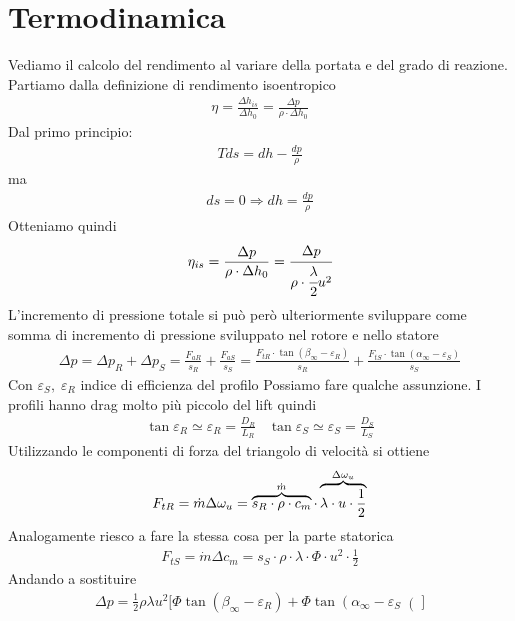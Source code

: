 \section{Termodinamica}
Vediamo il calcolo del rendimento al variare della portata e del grado di reazione. Partiamo dalla definizione di rendimento isoentropico
\begin{align*}
\eta = \frac{\Delta h_{is}}{\Delta h_0} = \frac{\Delta p}{\rho \cdot \Delta h_0}
\end{align*}
Dal primo principio:
\begin{align*}
T ds = dh - \frac{dp}{\rho}
\end{align*}
ma
\begin{align*}
ds = 0 \Rightarrow dh = \frac{dp}{\rho}
\end{align*}
Otteniamo quindi
\begin{equation}\label{eq:etadp}
\eta_{is} = \frac{\Delta p}{\rho \cdot \Delta h_0} = \cfrac{\Delta p}{\rho \cdot \cfrac{\lambda}{2} u^2}
\end{equation}
L'incremento di pressione totale si può però ulteriormente sviluppare come somma di incremento di pressione sviluppato nel rotore e nello statore
\begin{align*}
\Delta p = \Delta p_R + \Delta p_S = \frac{F_{aR}}{s_R} + \frac{F_{aS}}{s_S} = \frac{F_{tR} \cdot \tan(\beta_{\infty} - \varepsilon_R)}{s_R} + \frac{F_{tS} \cdot \tan(\alpha_{\infty} - \varepsilon_S)}{s_S}
\end{align*}
Con $\varepsilon_S, \; \varepsilon_R$ indice di efficienza del profilo
Possiamo fare qualche assunzione. I profili hanno drag molto più piccolo del lift quindi
\begin{align*}
\tan \varepsilon_R \simeq \varepsilon_R = \frac{D_R}{L_R} \;\;\; \tan \varepsilon_S \simeq \varepsilon_S = \frac{D_S}{L_S}
\end{align*}
Utilizzando le componenti di forza del triangolo di velocità si ottiene
\begin{align*}
F_{tR} = \dot{m} \Delta \omega_u = \overbrace{s_R \cdot \rho \cdot c_m}^\text{$ \dot{m} $} \cdot \overbrace{\lambda \cdot u \cdot \frac{1}{2}}^\text{$\Delta \omega_u$}  
\end{align*}
Analogamente riesco a fare la stessa cosa per la parte statorica
\begin{align*}
F_{tS} = \dot{m} \Delta c_m = s_S \cdot \rho \cdot \lambda \cdot \Phi \cdot u^2 \cdot \frac{1}{2}
\end{align*}
Andando a sostituire
\begin{align*}
\Delta p = \frac{1}{2} \rho \lambda u^2 \big[ \Phi \tan \left( \beta_{\infty} - \varepsilon_R \right) + \Phi \tan \left( \alpha_{\infty} - \varepsilon_S \right( \big] 
\end{align*}
